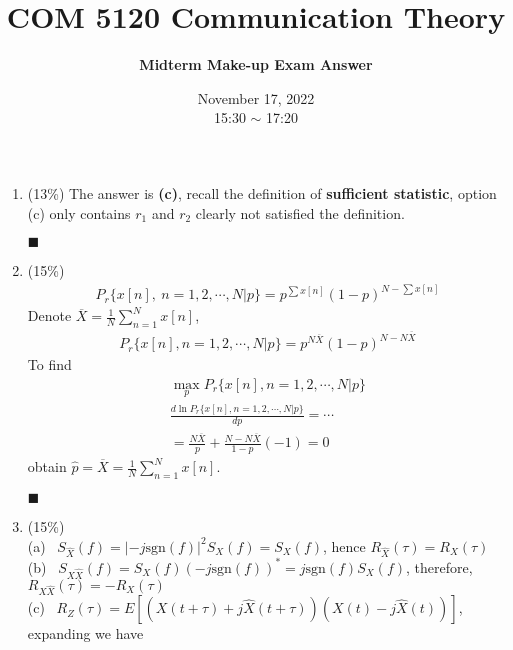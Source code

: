 \documentclass[a4paper,12pt]{article}
\title{\textbf{COM 5120 Communication Theory}}
\author{\textbf{Midterm Make-up Exam Answer}}
\date{November 17, 2022\\
15:30 $\sim$ 17:20
}
\begin{document}
    \maketitle
    \begin{enumerate}
        \item (13\%) 
            The answer is \textbf{(c)}, recall the definition of \textbf{sufficient statistic}, option (c) only contains $r_1$ and $r_2$ clearly not satisfied the definition.
            \begin{flushright}
                $\blacksquare$
            \end{flushright}
        \item (15\%) 
            \begin{align*}
                P_r\{x[n], \ n=1,2,\cdots,N|p\}=p^{\sum x[n]}(1-p)^{N-\sum x[n]}
            \end{align*}
            Denote $\overline{X}=\frac{1}{N}\sum\limits_{n=1}^Nx[n]$,
            \begin{align*}
                P_r\{ x[n],n=1,2,\cdots,N|p\}=p^{N\overline{X}}(1-p)^{N-N\overline{X}}
            \end{align*}
            To find 
            \begin{align*}
                \max_{p} P_r\{x[n],n=1,2,\cdots,N|p\}\\
                \frac{d\ln P_r\{ x[n],n=1,2,\cdots,N|p\}}{dp}=\cdots\\
                =\frac{N\overline{X}}{p}+\frac{N-N\overline{X}}{1-p}(-1)=0
            \end{align*}
            obtain $\widehat{p}=\overline{X}=\frac{1}{N}\sum\limits_{n=1}^{N}x[n]$.
            \begin{flushright}
                $\blacksquare$
            \end{flushright}
        \item (15\%) \\
        (a) \ $S_{\widehat{X}}(f)=|-j\text{sgn}(f)|^2S_X(f)=S_X(f)$, hence $R_{\widehat{X}}(\tau)=R_X(\tau)$\\
        (b) \ $S_{X\widehat{X}}(f)=S_X(f)(-j\text{sgn}(f))^*=j\text{sgn}(f)S_X(f)$, therefore, $R_{X\widehat{X}}(\tau)=-R_{X}(\tau)$\\
        (c) \ $R_Z(\tau)=E\left[ \left( X(t+\tau)+j\widehat{X}(t+\tau)\right)\left( X(t)-j\widehat{X}(t)\right)\right]$, expanding we have
        \begin{align*}

\end{align*}
\end{enumerate}
\end{document}
